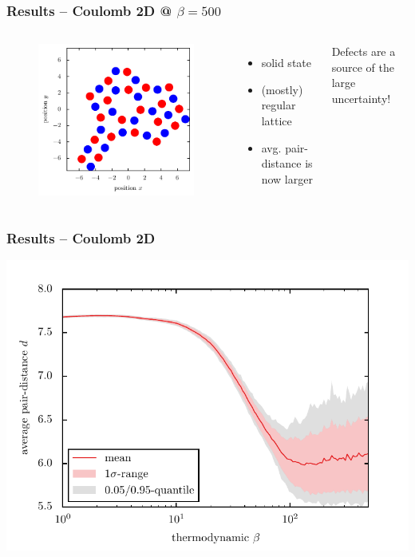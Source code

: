 \documentclass[mathserif,serif]{beamer}
\begin{document}
\begin{frame}
	\frametitle{Results -- Coulomb 2D @ $\beta=500$}
	\centering
	\begin{columns}	
	\begin{figure}
	\includegraphics[width=\textwidth]{../report/figures/Kristall_4_beta_500.pdf}
	\end{figure}
	\begin{itemize}
	\setlength{\itemsep}{1.5em}
	\item solid state
	\item (mostly) regular lattice
	\item avg. pair-distance is now larger
	\end{itemize}
	\vspace{2em}
	Defects are a source of the large uncertainty!
\end{columns}
\end{frame}

\begin{frame}
	\frametitle{Results -- Coulomb 2D}
	\centering
	\includegraphics[width=\textwidth]{../report/figures/temp_dep_coulomb2d.pdf}
\end{frame}
\end{document}
